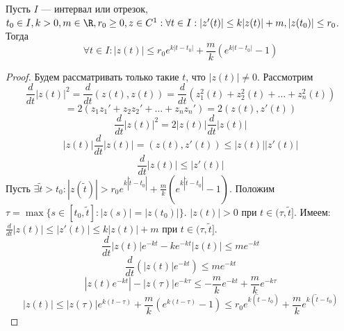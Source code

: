 \begin{lemma}
    Пусть \(I\) --- интервал или отрезок, \(t_0 \in I, k > 0, m \in \R, r_0 \ge 0, z \in C^1: \forall t \in I: |z'(t)| \le k|z(t)| + m, |z(t_0)| \le r_0\). Тогда 
    \[\forall t \in I: |z(t)| \le r_0e^{k|t - t_0|} + \frac{m}{k}\left( e^{k|t - t_0|} - 1\right)\]
\end{lemma}
\begin{proof}
    Будем рассматривать только такие \(t\), что \(|z(t)| \ne 0\). Рассмотрим 
    \[\frac{d}{dt}|z(t)|^2 = \frac{d}{dt}(z(t), z(t)) = \frac{d}{dt}\left( z_1^2(t) + z_2^2(t) + \dots + z_n^2(t) \right)\]
    \[= 2\left( z_1z_1' + z_2z_2' + \dots + z_nz_n' \right) = 2(z(t), z'(t))\]
    \[\frac{d}{dt}|z(t)|^2 = 2|z(t)|\frac{d}{dt}|z(t)|\]
    \[|z(t)|\frac{d}{dt}|z(t)| = (z(t), z'(t)) \le |z(t)||z'(t)|\]
    \[\frac{d}{dt}|z(t)| \le |z'(t)|\]
    Пусть \(\exists \tilde{t} > t_0: |z(\tilde{t})| > r_0e^{k|\tilde{t} - t_0|} + \frac{m}{k}\left( e^{k|\tilde{t} - t_0|} - 1 \right)\). Положим \(\tau = \max\{s \in [t_0, \tilde{t}]: |z(s)| = |z(t_0)|\}\). \(|z(t)| > 0\) при \(t \in (\tau, \tilde{t}]\). Имеем: \(\frac{d}{dt}|z(t)| \le |z'(t)| \le k|z(t)| + m\) при \(t \in (\tau, \tilde{t}]\).
    \[\frac{d}{dt}|z(t)|e^{-kt} - ke^{-kt}|z(t)| \le me^{-kt}\]
    \[\frac{d}{dt}\left( |z(t)|e^{-kt} \right) \le me^{-kt}\]
    \[|z(t)e^{-kt}| - |z(\tau)|e^{-k\tau} \le -\frac{m}{k}e^{-kt} + \frac{m}{k}e^{-k\tau}\]
    \[|z(t)| \le |z(\tau)|e^{k(t - \tau)} + \frac{m}{k}\left( e^{k(t - \tau)} - 1 \right) \le r_0e^{k(\tilde{t} - t_0)} + \frac{m}{k}e^{k(\tilde{t} - t_0)}\]
\end{proof}
